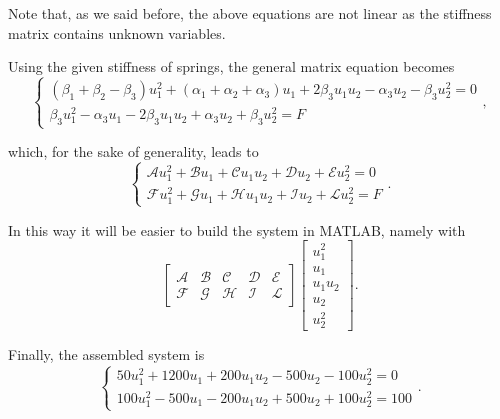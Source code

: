 Note that, as we said before, the above equations are not linear as the stiffness matrix contains unknown variables.

Using the given stiffness of springs, the general matrix equation becomes
\begin{equation}
\label{eq:spring_4}
\begin{cases}
\left( \beta_1+\beta_2-\beta_3 \right)u_1^2 +\left( \alpha_1+\alpha_2+\alpha_3 \right)u_1+2\beta_3u_1u_2-\alpha_3u_2-\beta_3u_2^2=0 \\
\beta_3u_1^2-\alpha_3u_1-2\beta_3u_1u_2+\alpha_3u_2+\beta_3u_2^2=F
\end{cases},
\end{equation}

which, for the sake of generality, leads to
\begin{equation}
\label{eq:spring_5}
\begin{cases}
\mathcal{A}u_1^2 +\mathcal{B}u_1+\mathcal{C}u_1u_2+\mathcal{D}u_2+\mathcal{E}u_2^2=0 \\
\mathcal{F}u_1^2 +\mathcal{G}u_1+\mathcal{H}u_1u_2+\mathcal{I}u_2+\mathcal{L}u_2^2=F
\end{cases}.
\end{equation}

In this way it will be easier to build the system in MATLAB, namely with
\begin{equation}
\label{eq:spring_6}
\left[
\begin{array}{ccccc}
\mathcal{A} & \mathcal{B} & \mathcal{C} & \mathcal{D} & \mathcal{E} \\
\mathcal{F} & \mathcal{G} & \mathcal{H} & \mathcal{I} & \mathcal{L}
\end{array}
\right]
\left[
\begin{array}{c}
u_1^2 \\
u_1 \\
u_1u_2 \\
u_2 \\
u_2^2
\end{array}
\right].
\end{equation}

Finally, the assembled system is
\begin{equation}
\label{eq:spring_7}
\begin{cases}
50u_1^2+1200u_1+200u_1u_2-500u_2-100u_2^2=0 \\
100u_1^2-500u_1-200u_1u_2+500u_2+100u_2^2=100
\end{cases}.
\end{equation}


